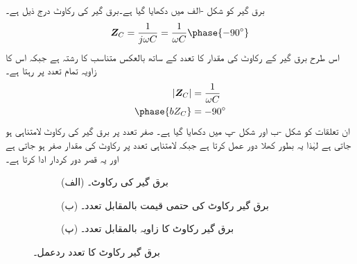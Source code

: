 برق گیر کو شکل -الف میں دکھایا گیا ہے۔برق گیر کی رکاوٹ درج ذیل ہے۔
\begin{align}
\bZ_C=\frac{1}{j\omega C}=\frac{1}{\omega C}\phase{-90^{\circ}}
\end{align}
اس طرح برق گیر کے رکاوٹ کی مقدار کا تعدد کے ساتھ بالعکس متناسب کا رشتہ ہے جبکہ اس کا زاویہ تمام تعدد پر  رہتا ہے۔
\begin{align}
\abs{\bZ_C}&=\frac{1}{\omega C}\\
\phase{bZ_C}&=-90^{\circ}
\end{align}
ان تعلقات کو شکل -ب اور شکل -پ میں دکھایا گیا ہے۔ صفر تعدد پر برق گیر کی رکاوٹ لامتناہی ہو جاتی ہے لہٰذا یہ بطور کھلا دور عمل کرتا ہے جبکہ لامتناہی تعدد پر رکاوٹ کی مقدار صفر ہو جاتی ہے اور یہ قصر دور کردار ادا کرتا ہے۔
\begin{figure}
\centering
\begin{subfigure}{1\textwidth}
\centering
{}
\caption*{(الف) برق گیر کی رکاوٹ۔}
\end{subfigure}
\begin{subfigure}{0.5\textwidth}
\centering
{}%
\caption*{(ب) برق گیر رکاوٹ کی حتمی قیمت بالمقابل تعدد۔}
\end{subfigure}%
\begin{subfigure}{0.5\textwidth}
\centering
{}%
\caption*{(پ) برق گیر رکاوٹ کا زاویہ بالمقابل تعدد۔}
\end{subfigure}%
\caption{برق گیر رکاوٹ کا تعدد ردعمل۔}
\label{شکل_تعددی_برق_گیری_ردعمل}
\end{figure}

